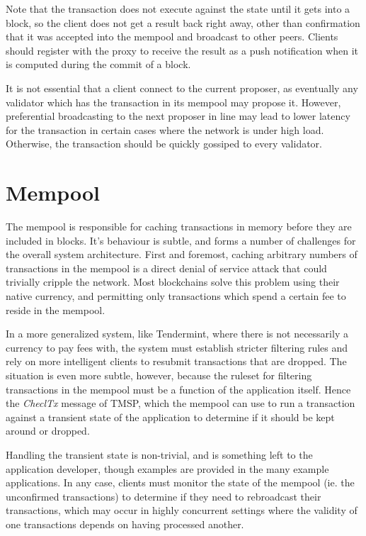 Note that the transaction does not execute against the state until it gets into a block,
so the client does not get a result back right away, other than confirmation that it was accepted into the mempool and broadcast to other peers.
Clients should register with the proxy to receive the result as a push notification when it is computed during the commit of a block.

It is not essential that a client connect to the current proposer, 
as eventually any validator which has the transaction in its mempool may propose it.
However, preferential broadcasting to the next proposer in line may lead to lower latency for the transaction
in certain cases where the network is under high load. Otherwise, the transaction should be quickly gossiped to every validator.

\section{Mempool}

The mempool is responsible for caching transactions in memory before they are included in blocks.
It's behaviour is subtle, and forms a number of challenges for the overall system architecture.
First and foremost, caching arbitrary numbers of transactions in the mempool is a direct denial of service attack
that could trivially cripple the network. Most blockchains solve this problem using their native currency,
and permitting only transactions which spend a certain fee to reside in the mempool.

In a more generalized system, like Tendermint, where there is not necessarily a currency to pay fees with,
the system must establish stricter filtering rules and rely on more intelligent clients to resubmit transactions that are dropped.
The situation is even more subtle, however, because the ruleset for filtering transactions in the mempool must be a function of the application itself.
Hence the \emph{CheclTx} message of TMSP,
which the mempool can use to run a transaction against a transient state of the application to determine if it should be kept around or dropped.

Handling the transient state is non-trivial, and is something left to the application developer, 
though examples are provided in the many example applications. 
In any case, clients must monitor the state of the mempool (ie. the unconfirmed transactions) to determine if they need to rebroadcast their transactions,
which may occur in highly concurrent settings where the validity of one transactions depends on having processed another.

